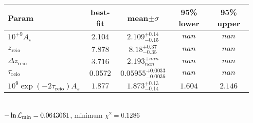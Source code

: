 \begin{tabular}{|l|c|c|c|c|} 
 \hline 
Param & best-fit & mean$\pm\sigma$ & 95\% lower & 95\% upper \\ \hline 
$10^{+9}A_{s }$ &$2.104$ & $2.109_{-0.15}^{+0.14}$ & $nan$ & $nan$ \\ 
$z_\mathrm{reio}$ &$7.878$ & $8.18_{-0.35}^{+0.37}$ & $nan$ & $nan$ \\ 
$\Delta z_\mathrm{reio}$ &$3.716$ & $2.193_{nan}^{+nan}$ & $nan$ & $nan$ \\ 
$\tau_\mathrm{reio}$ &$0.0572$ & $0.05955_{-0.0036}^{+0.0033}$ & $nan$ & $nan$ \\ 
$10^9 \exp(-2 \tau_\mathrm{reio}) A_s$ &$1.877$ & $1.873_{-0.14}^{+0.13}$ & $1.604$ & $2.146$ \\ 
\hline 
 \end{tabular} \\ 
$-\ln{\cal L}_\mathrm{min} =0.0643061$, minimum $\chi^2=0.1286$ \\ 
